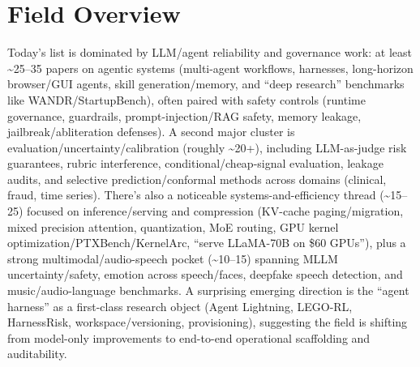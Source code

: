 \documentclass[12pt,letterpaper]{article}
\begin{document}
\medskip



\section*{Field Overview}
{\footnotesize Today's list is dominated by LLM/agent reliability and governance work: at least \textasciitilde{}25--35 papers on agentic systems (multi-agent workflows, harnesses, long-horizon browser/GUI agents, skill generation/memory, and ``deep research'' benchmarks like WANDR/StartupBench), often paired with safety controls (runtime governance, guardrails, prompt-injection/RAG safety, memory leakage, jailbreak/abliteration defenses). A second major cluster is evaluation/uncertainty/calibration (roughly \textasciitilde{}20+), including LLM-as-judge risk guarantees, rubric interference, conditional/cheap-signal evaluation, leakage audits, and selective prediction/conformal methods across domains (clinical, fraud, time series). There's also a noticeable systems-and-efficiency thread (\textasciitilde{}15--25) focused on inference/serving and compression (KV-cache paging/migration, mixed precision attention, quantization, MoE routing, GPU kernel optimization/PTXBench/KernelArc, ``serve LLaMA-70B on \$60 GPUs''), plus a strong multimodal/audio-speech pocket (\textasciitilde{}10--15) spanning MLLM uncertainty/safety, emotion across speech/faces, deepfake speech detection, and music/audio-language benchmarks. A surprising emerging direction is the ``agent harness'' as a first-class research object (Agent Lightning, LEGO-RL, HarnessRisk, workspace/versioning, provisioning), suggesting the field is shifting from model-only improvements to end-to-end operational scaffolding and auditability.}
\end{document}
